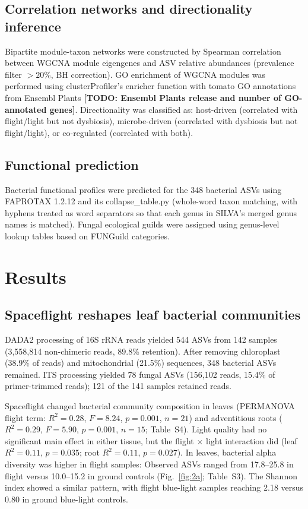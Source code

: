 \documentclass[pdflatex,sn-nature]{sn-jnl}
\begin{document}
\subsection{Correlation networks and directionality inference}
Bipartite module-taxon networks were constructed by Spearman correlation between
WGCNA module eigengenes and ASV relative abundances (prevalence filter \(>20\%\), BH
correction). GO enrichment of WGCNA modules was performed using clusterProfiler's
enricher function \cite{yu2012} with tomato GO annotations from Ensembl Plants
\textbf{[TODO: Ensembl Plants release and number of GO-annotated genes]}. Directionality was classified as: host-driven
(correlated with flight/light but not dysbiosis), microbe-driven (correlated with
dysbiosis but not flight/light), or co-regulated (correlated with both).

\subsection{Functional prediction}
Bacterial functional profiles were predicted for the 348 bacterial ASVs using FAPROTAX 1.2.12
\cite{louca2016} and its collapse\_table.py (whole-word taxon matching, with hyphens treated as
word separators so that each genus in SILVA's merged genus names is matched). Fungal ecological
guilds were assigned using genus-level lookup tables based on FUNGuild
\cite{nguyen2016} categories.

\section{Results}\label{sec:results}

\subsection{Spaceflight reshapes leaf bacterial communities}
DADA2 processing of 16S rRNA reads yielded 544 ASVs from 142 samples (3{,}558{,}814
non-chimeric reads, 89.8\% retention). After removing chloroplast (38.9\% of reads)
and mitochondrial (21.5\%) sequences, 348 bacterial ASVs remained. ITS processing
yielded 78 fungal ASVs (156{,}102 reads, 15.4\% of primer-trimmed reads); 121 of the 141 samples
retained reads.

Spaceflight changed bacterial community composition in leaves (PERMANOVA flight term:
\(R^2 = 0.28\), \(F = 8.24\), \(p = 0.001\), \(n = 21\)) and adventitious roots (\(R^2 = 0.29\),
\(F = 5.90\), \(p = 0.001\), \(n = 15\); Table~S4). Light quality had no significant main effect
in either tissue, but the flight \(\times\) light interaction did (leaf \(R^2 = 0.11\),
\(p = 0.035\); root \(R^2 = 0.11\), \(p = 0.027\)). In
leaves, bacterial alpha diversity was higher in flight samples: Observed ASVs ranged
from 17.8--25.8 in flight versus 10.0--15.2 in ground controls (Fig.~\ref{fig:2a};
Table~S3). The Shannon index showed a similar pattern, with flight blue-light
samples reaching 2.18 versus 0.80 in ground blue-light controls.
\end{document}
